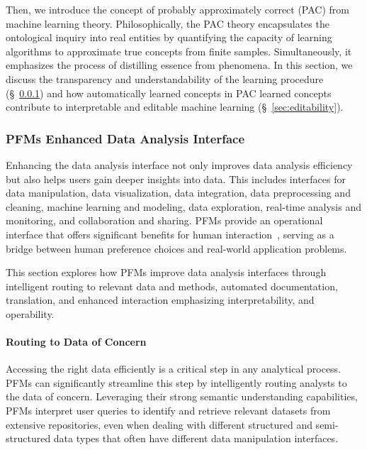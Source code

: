  Then, we introduce the concept of probably approximately correct (PAC) from machine learning theory. Philosophically, the PAC theory encapsulates the ontological inquiry into real entities by quantifying the capacity of learning algorithms to approximate true concepts from finite samples. Simultaneously, it emphasizes the process of distilling essence from phenomena. In this section, we discuss the transparency and understandability of the learning procedure (\S~\ref{sec:interface})  and how automatically learned concepts in PAC learned concepts contribute to interpretable and editable machine learning (\S~\ref{sec:editability}).
  
  \subsubsection{PFMs Enhanced Data Analysis Interface}\label{sec:interface}
  
  Enhancing the data analysis interface not only improves data analysis efficiency but also helps users gain deeper insights into data. This includes interfaces for data manipulation, data visualization, data integration, data preprocessing and cleaning, machine learning and modeling, data exploration, real-time analysis and monitoring, and collaboration and sharing. PFMs provide an operational interface that offers significant benefits for human interaction~\cite{dubiel2024device}, serving as a bridge between human preference choices and real-world application problems.
  
  This section explores how PFMs improve data analysis interfaces through intelligent routing to relevant data and methods, automated documentation, translation, and enhanced interaction emphasizing interpretability,  and operability.
  
  \paragraph{Routing to Data of Concern}
  
  Accessing the right data efficiently is a critical step in any analytical process. PFMs can significantly streamline this step by intelligently routing analysts to the data of concern. Leveraging their strong semantic understanding capabilities, PFMs interpret user queries to identify and retrieve relevant datasets from extensive repositories, even when dealing with different structured and semi-structured data types that often have different data manipulation interfaces.
  
